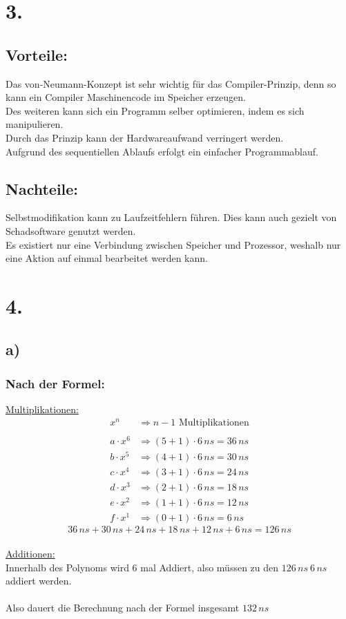 \documentclass[a4paper]{scrartcl}
\begin{document}
	
\section{3.}
	\subsection{Vorteile:}
		Das von-Neumann-Konzept ist sehr wichtig für das Compiler-Prinzip, denn so kann ein 
		Compiler Maschinencode im Speicher erzeugen.\\
		Des weiteren kann sich ein Programm selber optimieren, indem es sich manipulieren.\\
		Durch das Prinzip kann der Hardwareaufwand verringert werden. \\
		Aufgrund des sequentiellen Ablaufs erfolgt ein einfacher Programmablauf.
		
	\subsection{Nachteile:}	
		Selbstmodifikation kann zu Laufzeitfehlern führen. Dies kann auch gezielt von Schadsoftware 
		genutzt werden.\\
		Es existiert nur eine Verbindung zwischen Speicher und Prozessor, weshalb nur eine 
		Aktion auf einmal bearbeitet werden kann.


\section{4.}
	\subsection{a)}
		\subsubsection{Nach der Formel:}
			\underline{Multiplikationen:}
			\begin{align}
				x^n &\Rightarrow n-1 \text{ Multiplikationen} \\
    			\\
    			a\cdot x^6 &\Rightarrow (5+1)\cdot 6\, ns = 36\, ns \\
    			b\cdot x^5 &\Rightarrow (4+1)\cdot 6\, ns = 30\, ns \\
   		 		c\cdot x^4 &\Rightarrow (3+1)\cdot 6\, ns = 24\, ns \\
   		 		d\cdot x^3 &\Rightarrow (2+1)\cdot 6\, ns = 18\, ns \\
   		 		e\cdot x^2 &\Rightarrow (1+1)\cdot 6\, ns = 12\, ns \\
   	 			f\cdot x^1 &\Rightarrow (0+1)\cdot 6\, ns = 6\, ns 
			\end{align}
			\[36\, ns+30\, ns+24\, ns+18\, ns+12\, ns+6\, ns=126\, ns\]\\
   		 	\underline{Additionen:}\\
    			Innerhalb des Polynoms wird 6 mal Addiert, also müssen zu den \(126\, ns\ 6\, ns\) 
    			addiert werden.\\
				\\    	
	    	Also dauert die Berechnung nach der Formel insgesamt \(132\, ns\)\\
 
\end{document}
